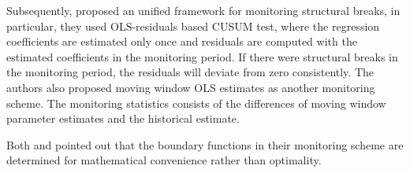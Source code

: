 \documentclass[preprint,authoryear,12pt,english]{elsarticle}
\theoremstyle{plain}
\begin{document}

Subsequently, \cite{Zeileis2005} proposed an unified framework for monitoring structural breaks, in particular, they used OLS-residuals based CUSUM test, where the regression coefficients are estimated only once and residuals are computed with the estimated coefficients in the monitoring period. If there were structural breaks in the monitoring period, the residuals will deviate from zero consistently. The authors also proposed moving window OLS estimates as another monitoring scheme. The monitoring statistics consists of the differences of moving window parameter estimates and the historical estimate.

Both \cite{Chu1996} and \cite{Zeileis2005} pointed out that the boundary functions in their monitoring scheme are determined for mathematical convenience rather than optimality.

\end{document}
